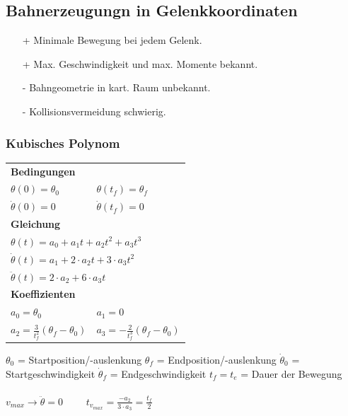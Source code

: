 \subsection{Bahnerzeugungn in Gelenkkoordinaten}
\begin{multicols}{2}
    \begin{itemize}
        \item[+] Minimale Bewegung bei jedem Gelenk.
        \item[+] Max. Geschwindigkeit und max. Momente bekannt.
    \end{itemize}

    \begin{itemize}
        \item[-] Bahngeometrie in kart. Raum unbekannt.
        \item[-] Kollisionsvermeidung schwierig.
    \end{itemize}
\end{multicols}
\clearpage
\subsubsection{Kubisches Polynom}
\begin{minipage}{0.5\linewidth}
\begin{tabular}{ll}
\multicolumn{2}{l}{\textbf{Bedingungen}}\\
$ \theta(0)=\theta_0 $& $ \theta(t_f) = \theta_f$\\ 
$ \dot{\theta}(0)=0 $& $ \dot{\theta}(t_f) = 0$\\
\multicolumn{2}{l}{\textbf{Gleichung}}\\
\multicolumn{2}{l}{$ \theta(t)=a_0 + a_1t + a_2t^2+a_3t^3$}\\
\multicolumn{2}{l}{$ \dot{\theta}(t)=a_1 + 2\cdot a_2t+3\cdot a_3t^2$}\\
\multicolumn{2}{l}{$ \ddot{\theta}(t)=2\cdot a_2+6\cdot a_3t$}\\
\multicolumn{2}{l}{\textbf{Koeffizienten}}\\
$a_0= \theta_0$&$a_1=0 $\\
$a_2 = \frac{3}{t_f^2}(\theta_f - \theta_0) $&$a_3=-\frac{2}{t_f^3}(\theta_f-\theta_0) $\\
\end{tabular}
\end{minipage}
\begin{minipage}{0.5\linewidth}
    $\theta_0$ = Startposition/-auslenkung\newline
    $\theta_f$ = Endposition/-auslenkung\newline
    $\dot{\theta}_0$ = Startgeschwindigkeit\newline
    $\dot{\theta}_f$ = Endgeschwindigkeit\newline
    $t_f=t_e$ = Dauer der Bewegung
    \\
    \\
    $v_{max} \rightarrow \ddot{\theta} = 0$\newline
    $\qquad t_{v_{max}} = \frac{-a_2}{3\cdot a_3} = \frac{t_f}{2}$
    
\end{minipage}
